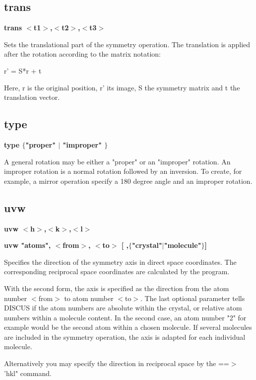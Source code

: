 \subsection*{trans}
{\bf trans $ <$t1$> $,$ <$t2$> $,$ <$t3$> $ \par }
\par
\vspace{3pt}
Sets the translational part of the symmetry operation. 
The translation is applied after the rotation according to the matrix 
notation: 
\par
\begin{MacVerbatim}
r' = S*r + t
\end{MacVerbatim}
Here, r is the original position, r' its image, S the symmetry matrix 
and t the translation vector. 
\subsection*{type}
{\bf type $ \{$"proper" $| $ "improper" $\} $ \par }
\par
\vspace{3pt}
A general rotation may be either a "proper" or an "improper" rotation. 
An improper rotation is a normal rotation followed by an inversion. 
To create, for example, a mirror operation specify a 180 degree angle 
and an improper rotation. 
\subsection*{uvw}
{\bf uvw $ <$h$> $,$ <$k$> $,$ <$l$> $ \par }
{\bf uvw "atoms", $ <$from$> $, $ <$to$> $ [ ,$ \{$"crystal"$| $"molecule"$\} $] \par }
\par
\vspace{3pt}
Specifies the direction of the symmetry axis in direct space 
coordinates. The corresponding reciprocal space coordinates are calculated 
by the program. 
\par
With the second form, the axis is specified as the direction from 
the atom number $ <$from$> $ to atom number $ <$to$> $. 
The last optional parameter tells DISCUS if the atom numbers are 
absolute within the crystal, or relative atom numbers within a molecule 
content. 
In the second case, an atom number "2" for example would be the second 
atom within a chosen molecule. If several molecules are included in the 
symmetry operation, the axis is adapted for each individual molecule. 
\par
Alternatively you may specify the direction in reciprocal space by the 
==$> $ 'hkl" command. 
\par
